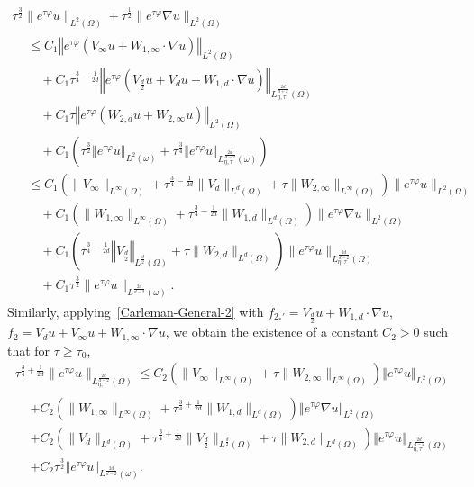 \documentclass[10pt]{amsart}
\theoremstyle{definition}\newtheorem{defi}[theo]{Definition}\newtheorem{rema}[theo]{Remark}\newtheorem{exam}[theo]{Example}\newtheorem{exem}[theo]{Example}\newtheorem{nota}[theo]{Notation}
\newcommand{\norm}[1]{\left\Vert#1\right\Vert}
\renewcommand{\leq}{\leqslant}
\renewcommand{\geq}{\geqslant}
\begin{document}
\begin{multline}\label{Carleman-General-1-appl}
\tau^{\frac{3}{2}} \| e^{\tau \varphi} u \|_{L^2(\Omega)} +
\tau^{\frac{1}{2}} \| e^{\tau \varphi} \nabla u \|_{L^2(\Omega)}\\
\begin{aligned}
&\leq C_1
\norm{e^{\tau \varphi} (V_{\infty} u+ W_{1,\infty} \cdot \nabla u)}_{L^2(\Omega)}
\\
&\quad +C_1
\tau^{\frac{3}{4}-\frac{1}{2d}} \norm{e^{\tau \varphi}\left(V_{\frac{d}{2}} u + V_{d} u+ W_{1,d} \cdot \nabla u\right)}_{L^{\frac{2d}{d+2}}_{\eta, \tau} (\Omega)}
\\
&\quad + C_1 \tau \norm{ e^{\tau \varphi}\left(W_{2,d} u + W_{2, \infty} u\right)}_{L^2(\Omega)}\\
&\quad + C_1 \left(\tau^{\frac{3}{2}} \norm{ e^{\tau \varphi} u}_{L^2(\omega)} + \tau^{\frac{3}{4}}\norm{ e^{\tau \varphi} u}_{L^{\frac{2d}{d-2}}_{\eta, \tau} (\omega)}\right)
\\
&\leq C_1 \left(\| V_\infty \|_{L^\infty(\Omega)} + \tau^{\frac{3}{4}-\frac{1}{2d}} \| V_{d} \|_{L^d(\Omega)} + \tau \| W_{2, \infty}\|_{L^\infty(\Omega)} \right)
\| e^{\tau \varphi} u \|_{L^2(\Omega)}
\\
&\quad + C_1 \left(\| W_{1,\infty} \|_{L^\infty(\Omega)} + \tau^{\frac{3}{4}-\frac{1}{2d}} \| W_{1,d} \|_{L^d(\Omega)} \right)
\| e^{\tau \varphi} \nabla u \|_{L^2(\Omega)}
\\
&\quad + C_1 \left(\tau^{\frac{3}{4}-\frac{1}{2d}} \norm{V_{\frac{d}{2}}}_{L^{\frac{d}{2}}(\Omega)} + \tau \| W_{2, d}\|_{L^d(\Omega)} \right)
\| e^{\tau \varphi} u \|_{L^{\frac{2d}{d-2}}_{\eta, \tau}(\Omega)}\\
&\quad + C_1 \tau^{\frac{3}{2}} \| e^{\tau \varphi} u\|_{L^{\frac{2d}{d-2}} (\omega)}.
\end{aligned}
\end{multline}
Similarly, applying~\eqref{Carleman-General-2} with $f_{2_*'} = V_{\frac{d}{2}} u + W_{1,d} \cdot \nabla u$, $f_2 = V_{d} u + V_{\infty} u+ W_{1,\infty} \cdot \nabla u$, we obtain the existence of a constant $C_2>0 $ such that for $\tau \geq \tau_0$,
\begin{multline}\label{Carleman-General-2-appl}
\tau^{\frac{3}{4}+\frac{1}{2d}} \| e^{\tau \varphi} u \|_{L^{\frac{2d}{d-2}}_{\eta,\tau} (\Omega)}
\leq C_2 \left(\| V_\infty \|_{L^\infty(\Omega)} + \tau \| W_{2, \infty}\|_{L^\infty(\Omega)} \right)
\norm{e^{\tau \varphi} u}_{L^2(\Omega)}
\\
\begin{aligned}
&+ C_2 \left(\| W_{1,\infty} \|_{L^\infty(\Omega)} + \tau^{\frac{3}{4}+\frac{1}{2d}} \| W_{1,d} \|_{L^d(\Omega)} \right)
\norm{e^{\tau \varphi} \nabla u}_{L^2(\Omega)}
\\
&+ C_2 \left(\| V_{d} \|_{L^d(\Omega)} \! + \tau^{\frac{3}{4}+\frac{1}{2d}} \| V_{\frac{d}{2}} \|_{L^{\frac{d}{2}}(\Omega)}\!\! + \tau \| W_{2, d}\|_{L^d(\Omega)} \right)
\norm{e^{\tau \varphi} u }_{L^{\frac{2d}{d-2}}_{\eta, \tau}(\Omega)} \\
&+ C_2\tau^{\frac{3}{2}} \norm{e^{\tau \varphi} u}_{L^{\frac{2d}{d-2}} (\omega)}.
\end{aligned}
\end{multline}
\end{document}
